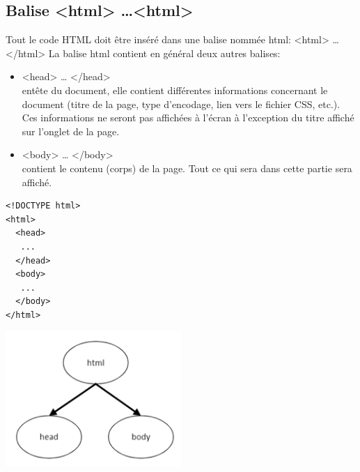 \documentclass[a4paper,11pt]{article}
\begin{document}
\subsection{Balise <html> \dots <html>}
Tout le code HTML doit être inséré dans une balise nommée html: <html> … </html>
La balise html contient en général deux autres balises:
\begin{itemize}
\item <head> … </head>\\
entête du document, elle contient différentes informations concernant le document (titre de la page, type d'encodage, lien vers le fichier CSS, etc.).
Ces informations ne seront pas affichées à l'écran à l'exception du titre affiché sur l'onglet de la page.
\item <body> … </body>\\
contient le contenu (corps) de la page. Tout ce qui sera dans cette partie sera affiché.
\end{itemize}
\begin{multicols}{2}
\begin{lstlisting}
<!DOCTYPE html>
<html>
  <head>
   ...
  </head>
  <body>
   ...
  </body>
</html>
\end{lstlisting}
\includegraphics[width=0.5\textwidth]{images/baliseHTML.png} \\
\end{multicols}

\newpage
\end{document}
